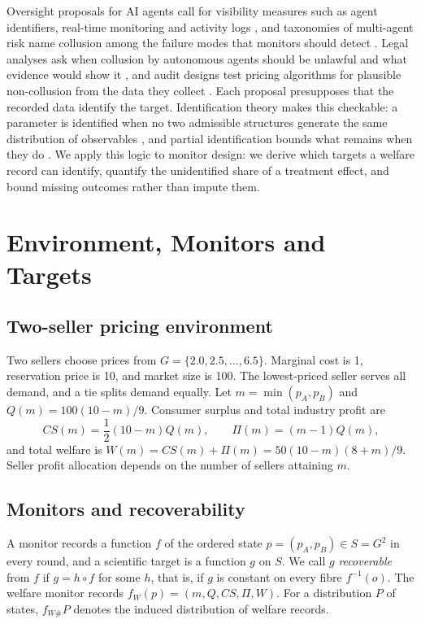 \documentclass[sigconf,review,anonymous]{acmart}
\begin{document}
Oversight proposals for AI agents call for visibility measures such as agent identifiers, real-time monitoring and activity logs \cite{chan2024visibility}, and taxonomies of multi-agent risk name collusion among the failure modes that monitors should detect \cite{hammond2025multiagent,dafoe2021cooperative}. Legal analyses ask when collusion by autonomous agents should be unlawful and what evidence would show it \cite{ezrachi2017artificial,harrington2018developing}, and audit designs test pricing algorithms for plausible non-collusion from the data they collect \cite{hartline2024regulation}. Each proposal presupposes that the recorded data identify the target. Identification theory makes this checkable: a parameter is identified when no two admissible structures generate the same distribution of observables \cite{rothenberg1971identification}, and partial identification bounds what remains when they do \cite{manski2003partial}. We apply this logic to monitor design: we derive which targets a welfare record can identify, quantify the unidentified share of a treatment effect, and bound missing outcomes rather than impute them.

\section{Environment, Monitors and Targets}\label{sec:env}

\subsection{Two-seller pricing environment}

Two sellers choose prices from $G=\{2.0,2.5,\ldots,6.5\}$. Marginal cost is 1, reservation price is 10, and market size is 100. The lowest-priced seller serves all demand, and a tie splits demand equally. Let $m=\min(p_A,p_B)$ and $Q(m)=100(10-m)/9$. Consumer surplus and total industry profit are
\begin{equation}
    CS(m)=\frac{1}{2}(10-m)Q(m), \qquad \Pi(m)=(m-1)Q(m),
\end{equation}
and total welfare is $W(m)=CS(m)+\Pi(m)=50(10-m)(8+m)/9$. Seller profit allocation depends on the number of sellers attaining $m$.

\subsection{Monitors and recoverability}

A monitor records a function $f$ of the ordered state $p=(p_A,p_B)\in S=G^2$ in every round, and a scientific target is a function $g$ on $S$. We call $g$ \emph{recoverable} from $f$ if $g=h\circ f$ for some $h$, that is, if $g$ is constant on every fibre $f^{-1}(o)$. The welfare monitor records $f_W(p)=(m,Q,CS,\Pi,W)$. For a distribution $P$ of states, $f_{W\#}P$ denotes the induced distribution of welfare records.
\end{document}
